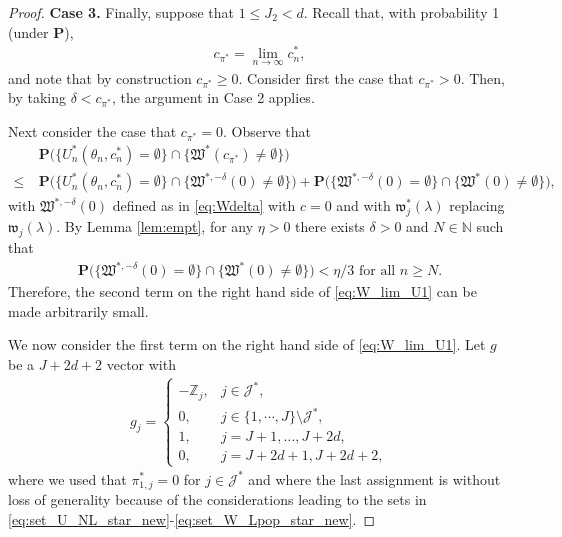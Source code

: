 \documentclass[letterpaper,11pt]{article}
\theoremstyle{myplain}
\theoremstyle{mydefinition}
\theoremstyle{myremark}
\newcommand{\HH}{\mathbb{Z}}
\newcommand{\N}{\mathbb{N}}
\newcommand{\cJ}{\mathcal{J}}
\numberwithin{equation}{section}
\numberwithin{figure}{section}
\begin{document}
\begin{appendices}
\begin{proof}
\noindent \textbf{Case 3.} Finally, suppose that $1\le J_2 <d$. Recall that, with probability 1 (under $\mathbf P$),
\begin{align}
c_{\pi^*}=\lim_{n \to \infty}c^*_{n},\label{eq:tilde_c_lim}
\end{align}
and note that by construction $c_{\pi^*}\ge0.$ 
Consider first the case that $c_{\pi^*}>0$. Then, by taking $\delta< c_{\pi^*}$, the argument in Case 2 applies.

Next consider the case that $c_{\pi^*}=0$.  
Observe that
\begin{align}
&~\mathbf{P}\Big( \{U^*_{n}(\theta_{n},c^{*}_{n})= \emptyset \} \cap \{ \mathfrak W^*(c_{\pi^*})\neq \emptyset \} \Big) \\
\le &~ \mathbf{P}\Big( \{U^*_{n}(\theta_{n},c^{*}_{n})= \emptyset \} \cap \{ \mathfrak W^{*,-\delta}(0)\neq \emptyset \} \Big) +\mathbf{P}\Big(\{\mathfrak W^{*,-\delta}(0)= \emptyset \} \cap \{ \mathfrak W^*(0)\neq \emptyset \} \Big),
\label{eq:W_lim_U1}
\end{align}
with $\mathfrak W^{*,-\delta}(0)$ defined as in \eqref{eq:Wdelta} with $c=0$ and with $\mathfrak{w}^*_{j}(\lambda)$ replacing $\mathfrak w_{j}(\lambda)$.
By Lemma \ref{lem:empt}, for any $\eta>0$ there exists $\delta>0$ and $N \in \N$ such that
\begin{align}
\mathbf{P}\Big(\{\mathfrak W^{*,-\delta}(0)= \emptyset \} \cap \{\mathfrak W^*(0)\neq \emptyset \} \Big)<\eta/3 \text{  for all } n\ge N.\label{eq:final2}
\end{align}
Therefore, the second term on the right hand side of \eqref{eq:W_lim_U1} can be made arbitrarily small. 


We now consider the first term  on the right hand side of \eqref{eq:W_lim_U1}. 
Let $g$ be a $J+2d+2$ vector with
 \begin{align}
 g_{j} =\left\{ \begin{array}{lll}
   - \HH_j, &  j\in \mathcal J^*,\\
  0, & j\in\{1,\cdots,J\}\setminus \mathcal J^*,\\
  1, &  j=J+1,\dots,J+2d,\\
 0, & j=J+2d+1,J+2d+2,
 	\end{array} 
 	\right. \label{eq:g}
 \end{align}
where we used that $\pi_{1,j}^*=0$ for $j\in\cJ^*$ and where the last assignment is without loss of generality because of the considerations leading to the sets in \eqref{eq:set_U_NL_star_new}-\eqref{eq:set_W_Lpop_star_new}. 


\end{proof}
\end{appendices}
\end{document}
